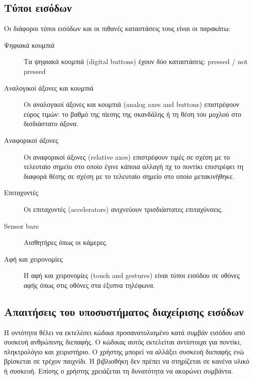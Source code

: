 	\subsection{Τύποι εισόδων}
	Οι διάφοροι τύποι εισόδων και οι πιθανές καταστάσεις τους είναι οι παρακάτω:
	\begin{description}	
	\item [Ψηφιακά κουμπιά] Tα ψηφιακά κουμπιά (digital buttons) έχουν δύο καταστάσεις: pressed / not pressed
	\item [Αναλογικοί άξονες και κουμπιά] Οι αναλογικοί άξονες και κουμπιά (analog axes and buttons) επιστρέφουν εύρος τιμών: το βαθμό της πίεσης της σκανδάλης ή τη θέση του μοχλού στο δισδιάστατο άξονα. 
	\item [Αναφορικοί άξονες] Οι αναφορικοί άξονες (relative axes) επιστρέφουν τιμές σε σχέση με το τελευταίο σημείο στο οποίο έγινε κάποια αλλαγή πχ το ποντίκι επιστρέφει τη διαφορά θέσης σε σχέση με το τελευταίο σημείο στο οποίο μετακινήθηκε.
	\item [Επιταχυντές] Οι επιταχυντές (accelerators) ανιχνεύουν τρισδιάστατες επιταχύνσεις.
	\item [Sensor bars] Αισθητήρες όπως οι κάμερες.
	\item [Αφή και χειρονομίες] Η αφή και χειρονομίες (touch and gestures) είναι τύποι εισόδου σε οθόνες αφής όπως στις οθόνες στα έξυπνα τηλέφωνα.
	\end{description}
	
	\subsection{Απαιτήσεις του υποσυστήματος διαχείρισης εισόδων}
	Η οντότητα θέλει να εκτελέσει κώδικα προσανατολισμένο κατά συμβάν εισόδου από συσκευή ανθρώπινης διεπαφής. Ο κώδικας αυτός εκτελείται αντίστοιχα για ποντίκι, πληκτρολόγιο και χειριστήριο. O χρήστης μπορεί να αλλάξει συσκευή διεπαφής ενώ βρίσκεται σε τρέχον παιχνίδι. Η βιβλιοθήκη δεν πρέπει να στηρίζεται σε κανένα υλικό ή συσκευή. Επίσης ο χρήστης χρειάζεται τη δυνατότητα να ακυρώνει συμβάντα.
		
